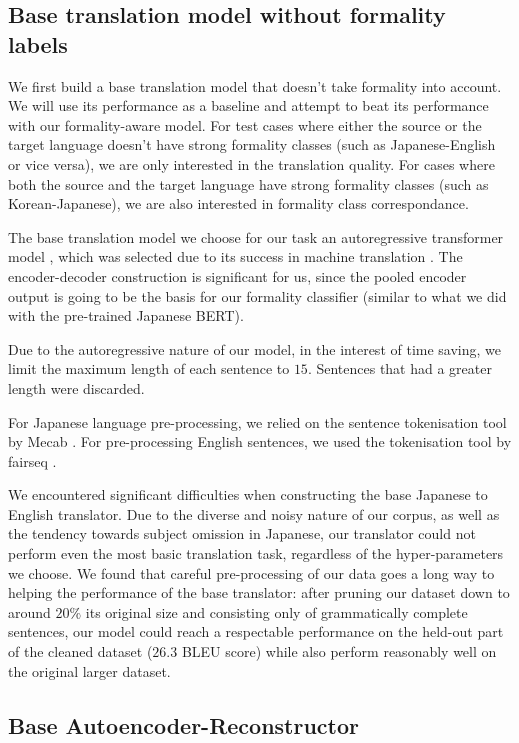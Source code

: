 \documentclass[11pt]{article}
\begin{document}
\subsection{Base translation model without formality labels}

We first build a base translation model that doesn't take formality into account. We will use its performance as a baseline and attempt to beat its performance with our formality-aware model. For test cases where either the source or the target language doesn't have strong formality classes (such as Japanese-English or vice versa), we are only interested in the translation quality. For cases where both the source and the target language have strong formality classes (such as Korean-Japanese), we are also interested in formality class correspondance.

The base translation model we choose for our task an autoregressive transformer model \cite{vaswani2017attention}, which was selected due to its success in machine translation \cite{liu2020deep}. The encoder-decoder construction is significant for us, since the pooled encoder output is going to be the basis for our formality classifier (similar to what we did with the pre-trained Japanese BERT).

Due to the autoregressive nature of our model, in the interest of time saving, we limit the maximum length of each sentence to $15$. Sentences that had a greater length were discarded.

For Japanese language pre-processing, we relied on the sentence tokenisation tool by Mecab \cite{Kudo2005MeCabY}. For pre-processing English sentences, we used the tokenisation tool by fairseq \cite{ott2019fairseq}.

We encountered significant difficulties when constructing the base Japanese to English translator. Due to the diverse and noisy nature of our corpus, as well as the tendency towards subject omission in Japanese, our translator could not perform even the most basic translation task, regardless of the hyper-parameters we choose. We found that careful pre-processing of our data goes a long way to helping the performance of the base translator: after pruning our dataset down to around $20\%$ its original size and consisting only of grammatically complete sentences, our model could reach a respectable performance on the held-out part of the cleaned dataset ($26.3$ BLEU score) while also perform reasonably well on the original larger dataset.

\subsection{Base Autoencoder-Reconstructor}
\end{document}
